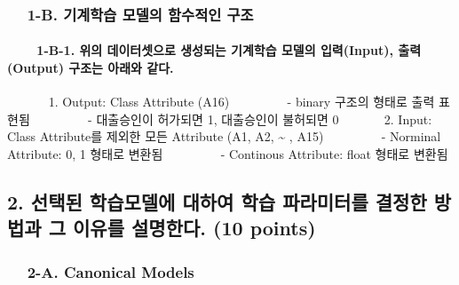 \documentclass[11pt]{article}
\begin{document}
    \hypertarget{b.-uxae30uxacc4uxd559uxc2b5-uxbaa8uxb378uxc758-uxd568uxc218uxc801uxc778-uxad6cuxc870}{%
\subsubsection{  1-B. 기계학습 모델의 함수적인
구조}\label{b.-uxae30uxacc4uxd559uxc2b5-uxbaa8uxb378uxc758-uxd568uxc218uxc801uxc778-uxad6cuxc870}}

    \hypertarget{b-1.-uxc704uxc758-uxb370uxc774uxd130uxc14buxc73cuxb85c-uxc0dduxc131uxb418uxb294-uxae30uxacc4uxd559uxc2b5-uxbaa8uxb378uxc758-uxc785uxb825input-uxcd9cuxb825output-uxad6cuxc870uxb294-uxc544uxb798uxc640-uxac19uxb2e4.}{%
\paragraph{   1-B-1. 위의 데이터셋으로 생성되는 기계학습 모델의
입력(Input), 출력(Output) 구조는 아래와
같다.}\label{b-1.-uxc704uxc758-uxb370uxc774uxd130uxc14buxc73cuxb85c-uxc0dduxc131uxb418uxb294-uxae30uxacc4uxd559uxc2b5-uxbaa8uxb378uxc758-uxc785uxb825input-uxcd9cuxb825output-uxad6cuxc870uxb294-uxc544uxb798uxc640-uxac19uxb2e4.}}

        1. Output: Class Attribute (A16)      - binary 구조의 형태로 출력
표현됨      - 대출승인이 허가되면 1, 대출승인이 불허되면 0     2. Input:
Class Attribute를 제외한 모든 Attribute (A1, A2, \textasciitilde{} ,
A15)      - Norminal Attribute: 0, 1 형태로 변환됨      - Continous
Attribute: float 형태로 변환됨 

    \hypertarget{uxc120uxd0dduxb41c-uxd559uxc2b5uxbaa8uxb378uxc5d0-uxb300uxd558uxc5ec-uxd559uxc2b5-uxd30cuxb77cuxbbf8uxd130uxb97c-uxacb0uxc815uxd55c-uxbc29uxbc95uxacfc-uxadf8-uxc774uxc720uxb97c-uxc124uxba85uxd55cuxb2e4.-10-points}{%
\subsection{2. 선택된 학습모델에 대하여 학습 파라미터를 결정한 방법과 그
이유를 설명한다. (10
points)}\label{uxc120uxd0dduxb41c-uxd559uxc2b5uxbaa8uxb378uxc5d0-uxb300uxd558uxc5ec-uxd559uxc2b5-uxd30cuxb77cuxbbf8uxd130uxb97c-uxacb0uxc815uxd55c-uxbc29uxbc95uxacfc-uxadf8-uxc774uxc720uxb97c-uxc124uxba85uxd55cuxb2e4.-10-points}}

    \hypertarget{a.-canonical-models}{%
\subsubsection{  2-A. Canonical Models}\label{a.-canonical-models}}
\end{document}
